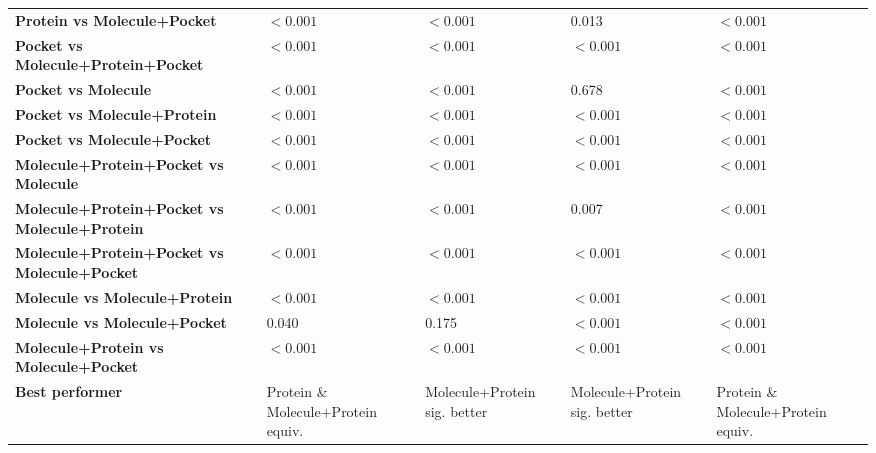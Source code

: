 \begin{table}[H]
{\begin{tabular}{lllll}
        \textbf{Protein vs Molecule+Pocket} & $< 0.001$ & $< 0.001$ & 0.013 & $< 0.001$ \\
        \textbf{Pocket vs Molecule+Protein+Pocket} & $< 0.001$ & $< 0.001$ & $< 0.001$ & $< 0.001$ \\
        \textbf{Pocket vs Molecule} & $< 0.001$ & $< 0.001$ & 0.678 & $< 0.001$ \\
        \textbf{Pocket vs Molecule+Protein} & $< 0.001$ & $< 0.001$ & $< 0.001$ & $< 0.001$ \\
        \textbf{Pocket vs Molecule+Pocket} & $< 0.001$ & $< 0.001$ & $< 0.001$ & $< 0.001$ \\
        \textbf{Molecule+Protein+Pocket vs Molecule} & $< 0.001$ & $< 0.001$ & $< 0.001$ & $< 0.001$ \\
        \textbf{Molecule+Protein+Pocket vs Molecule+Protein} & $< 0.001$ & $< 0.001$ & 0.007 & $< 0.001$ \\
        \textbf{Molecule+Protein+Pocket vs Molecule+Pocket} & $< 0.001$ & $< 0.001$ & $< 0.001$ & $< 0.001$ \\
        \textbf{Molecule vs Molecule+Protein} & $< 0.001$ & $< 0.001$ & $< 0.001$ & $< 0.001$ \\
        \textbf{Molecule vs Molecule+Pocket} & 0.040 & 0.175 & $< 0.001$ & $< 0.001$ \\
        \textbf{Molecule+Protein vs Molecule+Pocket} & $< 0.001$ & $< 0.001$ & $< 0.001$ & $< 0.001$ \\
        \textbf{Best performer} & Protein \& Molecule+Protein equiv. & Molecule+Protein sig. better & Molecule+Protein sig. better & Protein \& Molecule+Protein equiv. \\
        \bottomrule
    \end{tabular}}
\end{table}